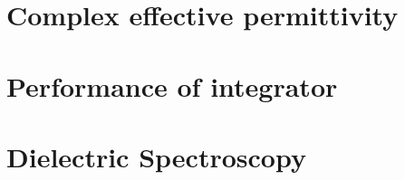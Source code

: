 \section{Complex effective permittivity}
\subsection{}

\section{Performance of integrator}

\section{Dielectric Spectroscopy}

\begin{figure}[htbp]
\end{figure}
